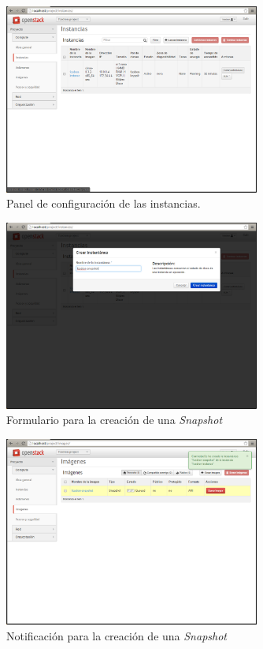\documentclass{article}
\begin{document}
\begin{figure}[h]
  \centering
    \includegraphics[width=0.75\textwidth]{img/m_058.png}
  \caption{Panel de configuración de las instancias.}
  \label{fig:InstanceButtonCreateSnapshot}
\end{figure}	

\begin{figure}[h]
  \centering
    \includegraphics[width=0.75\textwidth]{img/m_059.png}
  \caption{Formulario para la creación de una \emph{Snapshot}}
  \label{fig:InstanceCreateSnapshotForm}
\end{figure}	

\begin{figure}[h]
  \centering
    \includegraphics[width=0.75\textwidth]{img/m_060.png}
  \caption{Notificación para la creación de una \emph{Snapshot}}
  \label{fig:InstanceCreateSnapshotNotification}
\end{figure}	
\end{document}
